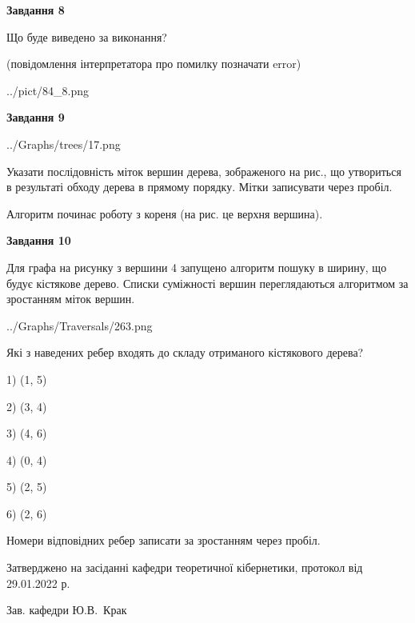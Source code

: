 \documentclass[12pt, ukrainian]{article}
\begin{document}
{\begin {large}
{\begin {center}\textbf{Завдання 8}\end {center}}\par
Що буде виведено за виконання?\par
 (повідомлення інтерпретатора про помилку позначати error)\par
\begin{center}
	{../pict/84_8.png}
\end{center}
\newpage

{\begin {center}\textbf{Завдання 9}\end {center}}\par

\begin{center}
	{../Graphs/trees/17.png}
\end{center}
Указати послідовність міток вершин дерева, зображеного на рис., що утвориться в результаті обходу дерева в прямому порядку. Мітки записувати через пробіл.\par Алгоритм починає роботу з кореня (на рис. це верхня вершина).\par
\newpage

{\begin {center}\textbf{Завдання 10}\end {center}}\par
Для графа на рисунку з вершини 4 запущено алгоритм пошуку в ширину, що будує кістякове дерево. Списки суміжності вершин переглядаються алгоритмом за зростанням міток вершин.\par
\begin{center}
	{../Graphs/Traversals/263.png}
\end{center}
\par Які з наведених ребер входять до складу отриманого кістякового дерева?\par
1) (1, 5)\par
2) (3, 4)\par
3) (4, 6)\par
4) (0, 4)\par
5) (2, 5)\par
6) (2, 6)\par
{\vskip 15pt} Номери відповідних ребер записати за зростанням через пробіл.\par
\newpage


\end {large}
}
{\smallskip \begin {small} Затверджено на засіданні кафедри теоретичної кібернетики, протокол  від   29.01.2022 р.\par\smallskip\smallskip
{\parbox {6.5 cm}{Зав. кафедри \dotfill Ю.В.~Крак}} \end{small}}
\end{document}
